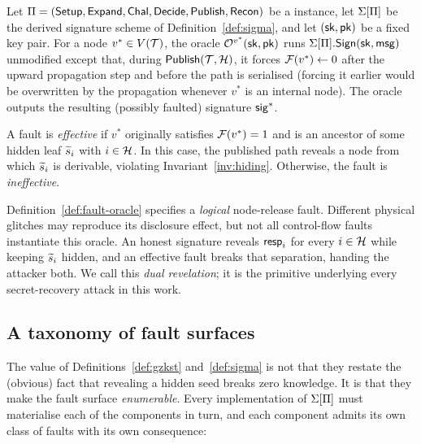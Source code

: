 \begin{definition}
\label{def:fault-oracle}
Let $\Pi=(\mathsf{Setup},\mathsf{Expand},\mathsf{Chal},\mathsf{Decide},\allowbreak
\mathsf{Publish},\allowbreak\mathsf{Recon})$ be a \GZKST{}
instance, let $\Sigma[\Pi]$ be the derived signature scheme of
Definition~\ref{def:sigma}, and let $(\mathsf{sk},\mathsf{pk})$ be a fixed key pair. For a
node $v^*\in V(\mathcal{T})$, the oracle $\mathcal{O}^{v^*}(\mathsf{sk},\mathsf{pk})$ runs
$\Sigma[\Pi].\mathsf{Sign}(\mathsf{sk},\mathsf{msg})$ unmodified except that, during
$\mathsf{Publish}(\mathcal{T},\mathcal{H})$, it forces
$\mathcal{F}(v^*) \leftarrow 0$
after the upward propagation step and before the path is serialised (forcing
it earlier would be overwritten by the propagation whenever $v^*$ is an
internal node). The oracle outputs the
resulting (possibly faulted) signature $\mathsf{sig}^*$.
\end{definition}

A fault is \emph{effective} if $v^*$ originally satisfies
$\mathcal{F}(v^*)=1$ and is an ancestor of some hidden leaf
$\widetilde{s}_i$ with $i\in\mathcal{H}$. In this case, the published path
reveals a node from which $\widetilde{s}_i$ is derivable, violating
Invariant~\ref{inv:hiding}. Otherwise, the fault is
\emph{ineffective}.

Definition~\ref{def:fault-oracle} specifies a \emph{logical} node-release
fault. Different physical glitches may reproduce its disclosure effect,
but not all control-flow faults instantiate this oracle. An honest signature reveals $\mathsf{resp}_i$ for every $i \in \mathcal{H}$ while
keeping $\widetilde{s}_i$ hidden, and an effective fault breaks that separation,
handing the attacker both. We call this \emph{dual revelation}; it is the
primitive underlying every secret-recovery attack in this work.

\subsection{A taxonomy of fault surfaces}
\label{sec:taxonomy}

The value of Definitions~\ref{def:gzkst} and~\ref{def:sigma} is not that they
restate the (obvious) fact that revealing a hidden seed breaks zero knowledge.
It is that they make the fault surface \emph{enumerable}. Every implementation
of $\Sigma[\Pi]$ must materialise each of the components in turn, and each
component admits its own class of faults with its own consequence:

